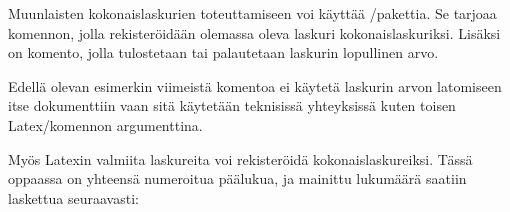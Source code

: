 Muunlaisten kokonaislaskurien toteuttamiseen voi käyttää
\-/pakettia. Se tarjoaa komennon,
jolla rekisteröidään olemassa oleva laskuri kokonaislaskuriksi. Lisäksi
on komento, jolla tulostetaan tai palautetaan laskurin lopullinen arvo.

\begin{koodilohkosis}
  \addtocounter{oma}{1} %
\end{koodilohkosis}

Edellä olevan esimerkin viimeistä komentoa  ei
käytetä laskurin arvon latomiseen itse dokumenttiin vaan sitä käytetään
teknisissä yhteyksissä kuten toisen Latex\-/komennon argumenttina.

Myös Latexin valmiita laskureita voi rekisteröidä kokonaislaskureiksi.
Tässä oppaassa on yhteensä  numeroitua päälukua, ja
mainittu lukumäärä saatiin laskettua seuraavasti:

\begin{koodilohkosis}
\end{koodilohkosis}
